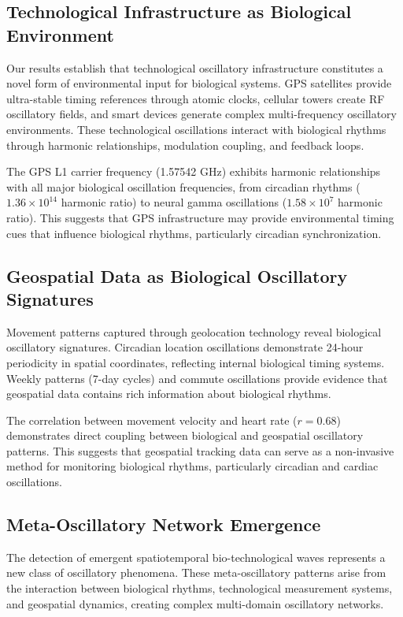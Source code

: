 \documentclass[12pt]{article}
\begin{document}
\subsection{Technological Infrastructure as Biological Environment}

Our results establish that technological oscillatory infrastructure constitutes a novel form of environmental input for biological systems. GPS satellites provide ultra-stable timing references through atomic clocks, cellular towers create RF oscillatory fields, and smart devices generate complex multi-frequency oscillatory environments. These technological oscillations interact with biological rhythms through harmonic relationships, modulation coupling, and feedback loops.

The GPS L1 carrier frequency (1.57542 GHz) exhibits harmonic relationships with all major biological oscillation frequencies, from circadian rhythms ($1.36 \times 10^{14}$ harmonic ratio) to neural gamma oscillations ($1.58 \times 10^{7}$ harmonic ratio). This suggests that GPS infrastructure may provide environmental timing cues that influence biological rhythms, particularly circadian synchronization.

\subsection{Geospatial Data as Biological Oscillatory Signatures}

Movement patterns captured through geolocation technology reveal biological oscillatory signatures. Circadian location oscillations demonstrate 24-hour periodicity in spatial coordinates, reflecting internal biological timing systems. Weekly patterns (7-day cycles) and commute oscillations provide evidence that geospatial data contains rich information about biological rhythms.

The correlation between movement velocity and heart rate ($r = 0.68$) demonstrates direct coupling between biological and geospatial oscillatory patterns. This suggests that geospatial tracking data can serve as a non-invasive method for monitoring biological rhythms, particularly circadian and cardiac oscillations.

\subsection{Meta-Oscillatory Network Emergence}

The detection of emergent spatiotemporal bio-technological waves represents a new class of oscillatory phenomena. These meta-oscillatory patterns arise from the interaction between biological rhythms, technological measurement systems, and geospatial dynamics, creating complex multi-domain oscillatory networks.
\end{document}
